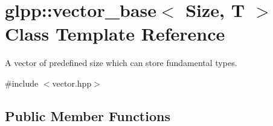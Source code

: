 \hypertarget{classglpp_1_1vector__base}{}\section{glpp\+:\+:vector\+\_\+base$<$ Size, T $>$ Class Template Reference}
\label{classglpp_1_1vector__base}


A vector of predefined size which can store fundamental types.  




{\ttfamily \#include $<$vector.\+hpp$>$}

\subsection*{Public Member Functions}

